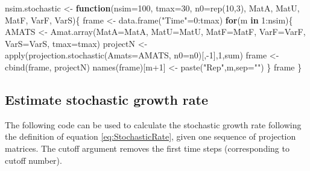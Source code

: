 \documentclass[
]{book}
\newenvironment{Shaded}{\begin{snugshade}}{\end{snugshade}}
\newcommand{\AttributeTok}[1]{\textcolor[rgb]{0.77,0.63,0.00}{#1}}
\newcommand{\ControlFlowTok}[1]{\textcolor[rgb]{0.13,0.29,0.53}{\textbf{#1}}}
\newcommand{\DecValTok}[1]{\textcolor[rgb]{0.00,0.00,0.81}{#1}}
\newcommand{\FunctionTok}[1]{\textcolor[rgb]{0.00,0.00,0.00}{#1}}
\newcommand{\NormalTok}[1]{#1}
\newcommand{\OtherTok}[1]{\textcolor[rgb]{0.56,0.35,0.01}{#1}}
\newcommand{\SpecialCharTok}[1]{\textcolor[rgb]{0.00,0.00,0.00}{#1}}
\newcommand{\StringTok}[1]{\textcolor[rgb]{0.31,0.60,0.02}{#1}}
\begin{document}
\begin{Shaded}
\begin{Highlighting}[]
\NormalTok{nsim.stochastic }\OtherTok{\textless{}{-}} \ControlFlowTok{function}\NormalTok{(}\AttributeTok{nsim=}\DecValTok{100}\NormalTok{, }
                            \AttributeTok{tmax=}\DecValTok{30}\NormalTok{, }
                            \AttributeTok{n0=}\FunctionTok{rep}\NormalTok{(}\DecValTok{10}\NormalTok{,}\DecValTok{3}\NormalTok{), }
\NormalTok{                            MatA, }
\NormalTok{                            MatU, }
\NormalTok{                            MatF, }
\NormalTok{                            VarF, }
\NormalTok{                            VarS)\{}
\NormalTok{  frame }\OtherTok{\textless{}{-}}  \FunctionTok{data.frame}\NormalTok{(}\StringTok{"Time"}\OtherTok{=}\DecValTok{0}\SpecialCharTok{:}\NormalTok{tmax)}
  \ControlFlowTok{for}\NormalTok{(m }\ControlFlowTok{in} \DecValTok{1}\SpecialCharTok{:}\NormalTok{nsim)\{}
\NormalTok{  AMATS }\OtherTok{\textless{}{-}} \FunctionTok{Amat.array}\NormalTok{(}\AttributeTok{MatA=}\NormalTok{MatA, }
                      \AttributeTok{MatU=}\NormalTok{MatU, }
                      \AttributeTok{MatF=}\NormalTok{MatF, }
                      \AttributeTok{VarF=}\NormalTok{VarF, }
                      \AttributeTok{VarS=}\NormalTok{VarS, }
                      \AttributeTok{tmax=}\NormalTok{tmax)}
\NormalTok{   projectN }\OtherTok{\textless{}{-}} \FunctionTok{apply}\NormalTok{(}\FunctionTok{projection.stochastic}\NormalTok{(}\AttributeTok{Amats=}\NormalTok{AMATS, }
                                           \AttributeTok{n0=}\NormalTok{n0)[,}\SpecialCharTok{{-}}\DecValTok{1}\NormalTok{],}\DecValTok{1}\NormalTok{,sum)}
\NormalTok{  frame }\OtherTok{\textless{}{-}} \FunctionTok{cbind}\NormalTok{(frame, projectN)}
  \FunctionTok{names}\NormalTok{(frame)[m}\SpecialCharTok{+}\DecValTok{1}\NormalTok{] }\OtherTok{\textless{}{-}} \FunctionTok{paste}\NormalTok{(}\StringTok{"Rep"}\NormalTok{,m,}\AttributeTok{sep=}\StringTok{""}\NormalTok{)}
\NormalTok{  \}}
\NormalTok{  frame}
\NormalTok{\}}
\end{Highlighting}
\end{Shaded}

\hypertarget{estimate-stochastic-growth-rate}{%
\subsection{Estimate stochastic growth rate}\label{estimate-stochastic-growth-rate}}

The following code can be used to calculate the stochastic growth rate following the definition of equation \eqref{eq:StochasticRate}, given one sequence of projection matrices. The cutoff argument removes the first time steps (corresponding to cutoff number).
\end{document}
